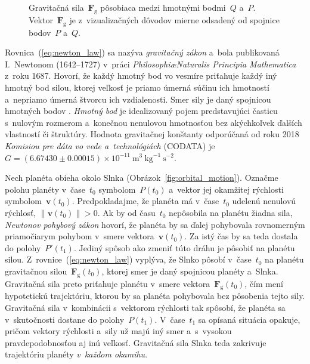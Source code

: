 \documentclass[a4paper,12pt]{book}
\newcommand{\gidx}{\mathrm g}
\let\vec\mathbf
\begin{document}
\begin{figure}[b]
\centering

\caption{Gravitačná sila~$\vec F_\gidx$ pôsobiaca medzi hmotnými bodmi~$Q$ 
a~$P$.  Vektor~$\vec F_\gidx$ je z~vizualizačných dôvodov mierne odsadený od 
spojnice bodov~$P$ a~$Q$.}
\label{fig:newton_law}
\end{figure}

Rovnica~(\ref{eq:newton_law}) sa nazýva \emph{gravitačný zákon} a~bola 
publikovaná I.~Newtonom (1642--1727) v~práci \emph{Philosophi\ae Naturalis 
Principia Mathematica} z~roku 1687.  Hovorí, že každý hmotný bod vo vesmíre 
priťahuje každý iný hmotný bod silou, ktorej veľkosť je priamo úmerná súčinu 
ich hmotností a~nepriamo úmerná štvorcu ich vzdialenosti.  Smer sily je daný 
spojnicou hmotných bodov \parencite{Kellogg1967}.  \emph{Hmotný bod} je 
idealizovaný pojem predstavujúci časticu s~nulovým rozmerom a~konečnou 
nenulovou hmotnosťou bez akýchkoľvek ďalších vlastností či štruktúry.  Hodnota 
gravitačnej konštanty odporúčaná od roku 2018 \emph{Komisiou pre dáta vo vede 
a~technológiách} (CODATA) je~$G = (6.67430 \pm 0.00015) \times 10^{-11} 
\ \mathrm{m}^3 \ \mathrm{kg}^{-1} \ \mathrm{s}^{-2}$.

Nech planéta obieha okolo Slnka (Obrázok~\ref{fig:orbital_motion}).  Označme 
polohu planéty v~čase~$t_0$ symbolom~$P(t_0)$ a~vektor jej okamžitej rýchlosti 
symbolom~$\vec v(t_0)$.  Predpokladajme, že planéta má v~čase~$t_0$ udelenú 
nenulovú rýchlosť, $\| \vec v(t_0) \| > 0$.  Ak by od času~$t_0$ nepôsobila na 
planétu žiadna sila, \emph{Newtonov pohybový zákon} hovorí, že planéta by sa 
ďalej pohybovala rovnomerným priamočiarym pohybom v~smere vektora~$\vec 
v(t_0)$.  Za istý čas by sa teda dostala do polohy~$P'(t_1)$.  Jediný spôsob 
ako zmeniť túto dráhu je pôsobiť na planétu silou.  
Z~rovnice~(\ref{eq:newton_law}) vyplýva, že Slnko pôsobí v~čase~$t_0$ na 
planétu gravitačnou silou~$\vec F_\gidx(t_0)$, ktorej smer je daný spojnicou 
planéty a~Slnka.  Gravitačná sila preto priťahuje planétu v~smere vektora~$\vec 
F_\gidx(t_0)$, čím mení hypotetickú trajektóriu, ktorou by sa planéta 
pohybovala bez pôsobenia tejto sily.  Gravitačná sila v~kombinácii s~vektorom 
rýchlosti tak spôsobí, že planéta sa v~skutočnosti dostane do polohy~$P(t_1)$.  
V~čase~$t_1$ sa opísaná situácia opakuje, pričom vektory rýchlosti a~sily už 
majú iný smer a~s~vysokou pravdepodobnosťou aj inú veľkosť.  Gravitačná sila 
Slnka teda zakrivuje trajektóriu planéty \emph{v~každom okamihu}.
\end{document}

